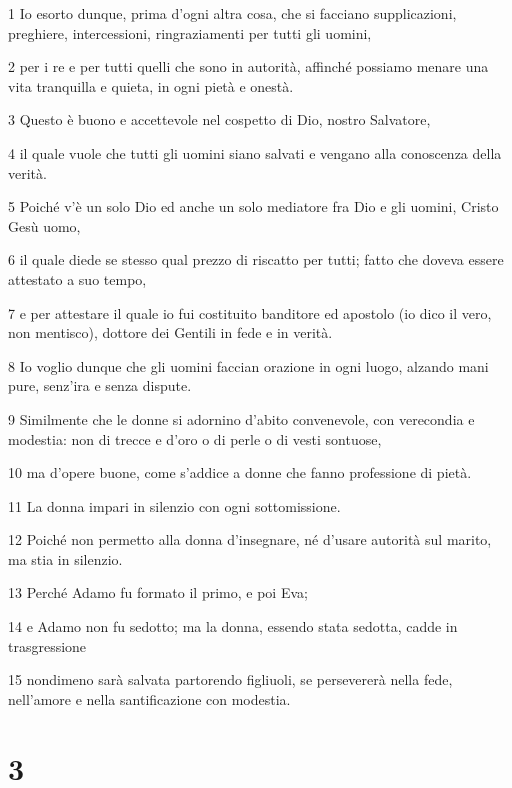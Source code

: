 \par 1 Io esorto dunque, prima d'ogni altra cosa, che si facciano supplicazioni, preghiere, intercessioni, ringraziamenti per tutti gli uomini,
\par 2 per i re e per tutti quelli che sono in autorità, affinché possiamo menare una vita tranquilla e quieta, in ogni pietà e onestà.
\par 3 Questo è buono e accettevole nel cospetto di Dio, nostro Salvatore,
\par 4 il quale vuole che tutti gli uomini siano salvati e vengano alla conoscenza della verità.
\par 5 Poiché v'è un solo Dio ed anche un solo mediatore fra Dio e gli uomini, Cristo Gesù uomo,
\par 6 il quale diede se stesso qual prezzo di riscatto per tutti; fatto che doveva essere attestato a suo tempo,
\par 7 e per attestare il quale io fui costituito banditore ed apostolo (io dico il vero, non mentisco), dottore dei Gentili in fede e in verità.
\par 8 Io voglio dunque che gli uomini faccian orazione in ogni luogo, alzando mani pure, senz'ira e senza dispute.
\par 9 Similmente che le donne si adornino d'abito convenevole, con verecondia e modestia: non di trecce e d'oro o di perle o di vesti sontuose,
\par 10 ma d'opere buone, come s'addice a donne che fanno professione di pietà.
\par 11 La donna impari in silenzio con ogni sottomissione.
\par 12 Poiché non permetto alla donna d'insegnare, né d'usare autorità sul marito, ma stia in silenzio.
\par 13 Perché Adamo fu formato il primo, e poi Eva;
\par 14 e Adamo non fu sedotto; ma la donna, essendo stata sedotta, cadde in trasgressione
\par 15 nondimeno sarà salvata partorendo figliuoli, se persevererà nella fede, nell'amore e nella santificazione con modestia.

\chapter{3}

